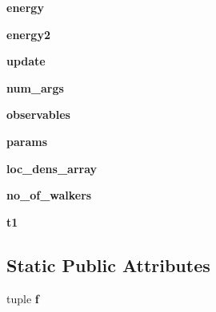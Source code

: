 \begin{DoxyCompactItemize}
\item 
\hypertarget{classMontePython_1_1MontePython_a38d0f717abd0785b4e4f797893e4f903}{}{\bfseries energy}\label{classMontePython_1_1MontePython_a38d0f717abd0785b4e4f797893e4f903}

\item 
\hypertarget{classMontePython_1_1MontePython_a0e9566c7c44c4538c7fd5656c2f9c323}{}{\bfseries energy2}\label{classMontePython_1_1MontePython_a0e9566c7c44c4538c7fd5656c2f9c323}

\item 
\hypertarget{classMontePython_1_1MontePython_a1ada8cb032bc2dbf24b61e0dc4cdf44d}{}{\bfseries update}\label{classMontePython_1_1MontePython_a1ada8cb032bc2dbf24b61e0dc4cdf44d}

\item 
\hypertarget{classMontePython_1_1MontePython_aef74b136a1d70e3c5dd489057cba1e18}{}{\bfseries num\+\_\+args}\label{classMontePython_1_1MontePython_aef74b136a1d70e3c5dd489057cba1e18}

\item 
\hypertarget{classMontePython_1_1MontePython_a998bab700f86f6b9e8c2f85db9f755aa}{}{\bfseries observables}\label{classMontePython_1_1MontePython_a998bab700f86f6b9e8c2f85db9f755aa}

\item 
\hypertarget{classMontePython_1_1MontePython_a20c1c4426416d6cede67d615f20dcfa7}{}{\bfseries params}\label{classMontePython_1_1MontePython_a20c1c4426416d6cede67d615f20dcfa7}

\item 
\hypertarget{classMontePython_1_1MontePython_adf51af646d20546df9608dbaa376e6b1}{}{\bfseries loc\+\_\+dens\+\_\+array}\label{classMontePython_1_1MontePython_adf51af646d20546df9608dbaa376e6b1}

\item 
\hypertarget{classMontePython_1_1MontePython_ab6f6ba1cccb2d182b06d68edd7790c37}{}{\bfseries no\+\_\+of\+\_\+walkers}\label{classMontePython_1_1MontePython_ab6f6ba1cccb2d182b06d68edd7790c37}

\item 
\hypertarget{classMontePython_1_1MontePython_ad2d2ac6c3ac255008b50031fb9fedee4}{}{\bfseries t1}\label{classMontePython_1_1MontePython_ad2d2ac6c3ac255008b50031fb9fedee4}

\end{DoxyCompactItemize}
\subsection*{Static Public Attributes}
\begin{DoxyCompactItemize}
\item 
tuple {\bfseries f}
\end{DoxyCompactItemize}
